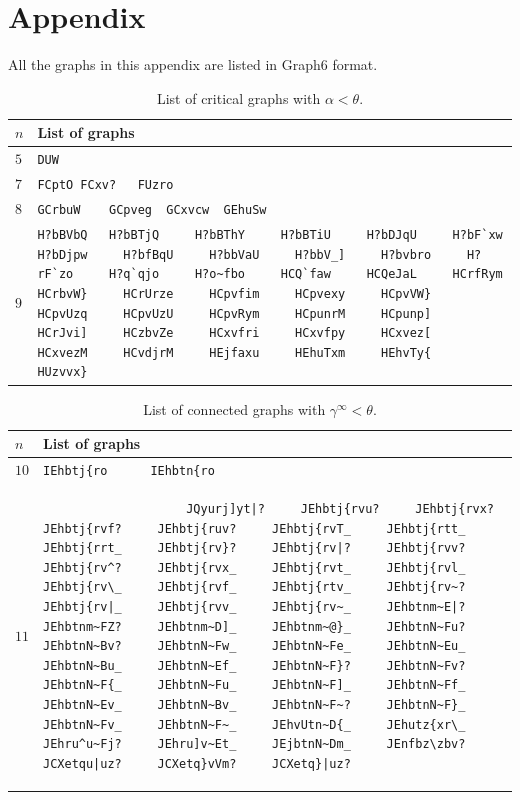 \documentclass[11pt]{article}
\begin{document}
	\newpage
	\section*{Appendix}
	
	All the graphs in this appendix are listed in Graph6 format.
	
	\begin{table}[h!]
		\small
		\begin{center}
			\caption{List of critical graphs with $\alpha<\theta$.}
			\label{Appendix:Critical}
			\begin{tabular}{|p{0.5cm} | p{14.5cm}|}
				\hline
				$n$ & List of graphs \\
				\hline
				\hline
				$5$ & 
				\verb|DUW| \\
				\hline
				$7$ & 
				\verb|FCptO	FCxv?	FUzro| \\
				\hline
				$8$ & 
				\verb|GCrbuW	GCpveg	GCxvcw	GEhuSw| \\
				\hline
				$9$ & 
				\verb|H?bBVbQ	H?bBTjQ		H?bBThY		H?bBTiU		H?bDJqU		H?bF`xw		H?bDjpw		H?bfBqU		H?bbVaU		H?bbV_]		H?bvbro		H?rF`zo		H?q`qjo		H?o~fbo		HCQ`faw		HCQeJaL		HCrfRym		HCrbvW}		HCrUrze		HCpvfim		HCpvexy		HCpvVW}		HCpvUzq		HCpvUzU		HCpvRym		HCpunrM		HCpunp]		HCrJvi]		HCzbvZe		HCxvfri		HCxvfpy		HCxvez[		HCxvezM		HCvdjrM		HEjfaxu		HEhuTxm		HEhvTy{		HUzvvx}| \\
				\hline
			\end{tabular}
		\end{center}
	\end{table}

	\begin{table}[h!]
		\small
		\begin{center}
			\caption{List of connected graphs with $\gamma^\infty<\theta$.}
			\label{Appendix:GammaInftyTheta}
			\begin{tabular}{|p{0.5cm} | p{14.5cm}|}
				\hline
				$n$ & List of graphs \\
				\hline
				\hline
				$10$ & \verb|IEhbtj{ro		IEhbtn{ro| \\
				\hline
				$11$ & 
				\vspace{-18pt}				
				\begin{verbatim}
					JQyurj]yt|?		JEhbtj{rvu?		JEhbtj{rvx?		JEhbtj{rvf?		JEhbtj{ruv?		JEhbtj{rvT_		JEhbtj{rtt_		JEhbtj{rrt_		JEhbtj{rv}?		JEhbtj{rv|?		JEhbtj{rvv?		JEhbtj{rv^?		JEhbtj{rvx_		JEhbtj{rvt_		JEhbtj{rvl_		JEhbtj{rv\_		JEhbtj{rvf_		JEhbtj{rtv_		JEhbtj{rv~?		JEhbtj{rv|_		JEhbtj{rvv_		JEhbtj{rv~_		JEhbtnm~E|?		JEhbtnm~FZ?		JEhbtnm~D]_		JEhbtnm~@}_		JEhbtnN~Fu?		JEhbtnN~Bv?		JEhbtnN~Fw_		JEhbtnN~Fe_		JEhbtnN~Eu_		JEhbtnN~Bu_		JEhbtnN~Ef_		JEhbtnN~F}?		JEhbtnN~Fv?		JEhbtnN~F{_		JEhbtnN~Fu_		JEhbtnN~F]_		JEhbtnN~Ff_		JEhbtnN~Ev_		JEhbtnN~Bv_		JEhbtnN~F~?		JEhbtnN~F}_		JEhbtnN~Fv_		JEhbtnN~F~_		JEhvUtn~D{_		JEhutz{xr\_		JEhru^u~Fj?		JEhru]v~Et_		JEjbtnN~Dm_		JEnfbz\zbv?		JCXetqu|uz?		JCXetq}vVm?		JCXetq}|uz?		
				\end{verbatim} \\
				\hline
			\end{tabular}
		\end{center}
	\end{table}
	
\end{document}
